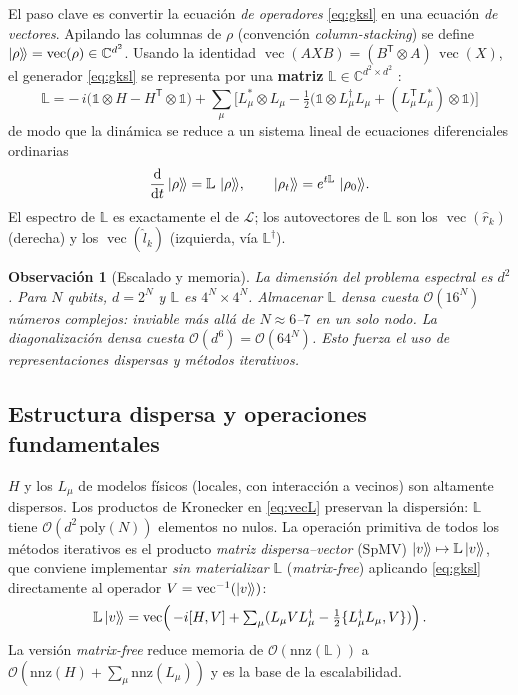\documentclass[11pt,a4paper]{article}
\theoremstyle{definition}
\theoremstyle{plain}
\newtheorem{observacion}{Observación}[section]
\newcommand{\Lop}{\mathcal{L}}
\newcommand{\vecop}[1]{\operatorname{vec}\!\left(#1\right)}
\begin{document}
El paso clave es convertir la ecuación \emph{de operadores} \eqref{eq:gksl} en una ecuación \emph{de
vectores}. Apilando las columnas de $\rho$ (convención \emph{column-stacking}) se define
$\ket{\rho}\!\rangle=\vecop{\rho}\in\mathbb{C}^{d^2}$. Usando la identidad
$\vecop{A X B}=(B^{\mathsf{T}}\otimes A)\,\vecop{X}$, el generador \eqref{eq:gksl} se representa por una
\textbf{matriz} $\mathbb{L}\in\mathbb{C}^{d^2\times d^2}$ \cite{Minganti2018,Weimer2021}:
\begin{equation}
\boxed{\;
\mathbb{L}= -\,i\big(\mathbb{1}\otimes H - H^{\mathsf{T}}\otimes\mathbb{1}\big)
+\sum_{\mu}\Big[
L_\mu^{*}\otimes L_\mu
-\tfrac12\big(\mathbb{1}\otimes L_\mu^{\dagger}L_\mu
+ (L_\mu^{\mathsf{T}}L_\mu^{*})\otimes\mathbb{1}\big)\Big]\;}
\label{eq:vecL}
\end{equation}
de modo que la dinámica se reduce a un sistema lineal de ecuaciones diferenciales ordinarias
\begin{equation}
\dv{t}\ket{\rho}\!\rangle=\mathbb{L}\,\ket{\rho}\!\rangle,
\qquad
\ket{\rho_t}\!\rangle=e^{t\mathbb{L}}\,\ket{\rho_0}\!\rangle .
\end{equation}
El espectro de $\mathbb{L}$ es exactamente el de $\Lop$; los autovectores de $\mathbb{L}$ son los
$\vecop{\hat r_k}$ (derecha) y los $\vecop{\hat l_k}$ (izquierda, vía $\mathbb{L}^{\dagger}$).

\begin{observacion}[Escalado y memoria]
La dimensión del problema espectral es $d^2$. Para $N$ qubits, $d=2^N$ y $\mathbb{L}$ es $4^N\times4^N$.
Almacenar $\mathbb{L}$ \emph{densa} cuesta $\mathcal{O}(16^N)$ números complejos: inviable más allá de
$N\!\approx\!6$--$7$ en un solo nodo. La diagonalización densa cuesta $\mathcal{O}(d^6)=\mathcal{O}(64^N)$.
Esto fuerza el uso de representaciones \emph{dispersas} y métodos iterativos.
\end{observacion}

\subsection{Estructura dispersa y operaciones fundamentales}

$H$ y los $L_\mu$ de modelos físicos (locales, con interacción a vecinos) son altamente dispersos. Los
productos de Kronecker en \eqref{eq:vecL} preservan la dispersión: $\mathbb{L}$ tiene
$\mathcal{O}(d^2\,\mathrm{poly}(N))$ elementos no nulos. La operación primitiva de todos los métodos
iterativos es el producto \emph{matriz dispersa--vector} (SpMV) $\ket{v}\!\rangle\mapsto\mathbb{L}\ket{v}\!\rangle$,
que conviene implementar \emph{sin materializar} $\mathbb{L}$ (\emph{matrix-free}) aplicando
\eqref{eq:gksl} directamente al operador $V=\operatorname{vec}^{-1}(\ket{v}\!\rangle)$:
\begin{equation}
\mathbb{L}\ket{v}\!\rangle=\vecop{\,-i[H,V]+\textstyle\sum_\mu(L_\mu V L_\mu^{\dagger}-\tfrac12\{L_\mu^{\dagger}L_\mu,V\})}.
\end{equation}
La versión \emph{matrix-free} reduce memoria de $\mathcal{O}(\mathrm{nnz}(\mathbb{L}))$ a
$\mathcal{O}(\mathrm{nnz}(H)+\sum_\mu\mathrm{nnz}(L_\mu))$ y es la base de la escalabilidad.
\end{document}
